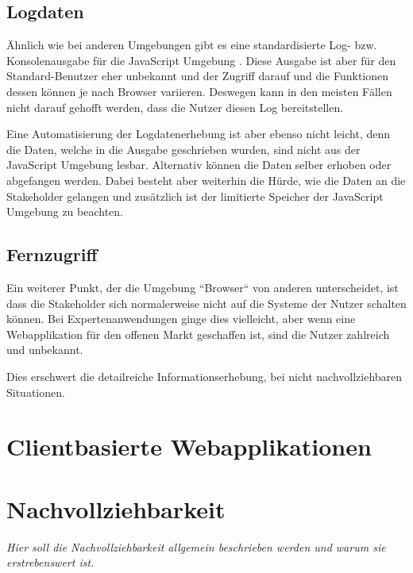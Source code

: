 \subsection{Logdaten}

Ähnlich wie bei anderen Umgebungen gibt es eine standardisierte Log- bzw. Konsolenausgabe für die JavaScript Umgebung \cite{MDNConsole}. Diese Ausgabe ist aber für den Standard-Benutzer eher unbekannt und der Zugriff darauf und die Funktionen dessen können je nach Browser variieren. Deswegen kann in den meisten Fällen nicht darauf gehofft werden, dass die Nutzer diesen Log bereitstellen.

Eine Automatisierung der Logdatenerhebung ist aber ebenso nicht leicht, denn die Daten, welche in die Ausgabe geschrieben wurden, sind nicht aus der JavaScript Umgebung lesbar. Alternativ können die Daten selber erhoben oder abgefangen werden. Dabei besteht aber weiterhin die Hürde, wie die Daten an die Stakeholder gelangen und zusätzlich ist der limitierte Speicher der JavaScript Umgebung zu beachten.

\subsection{Fernzugriff}

Ein weiterer Punkt, der die Umgebung ``Browser`` von anderen unterscheidet, ist dass die Stakeholder sich normalerweise nicht auf die Systeme der Nutzer schalten können. Bei Expertenanwendungen ginge dies vielleicht, aber wenn eine Webapplikation für den offenen Markt geschaffen ist, sind die Nutzer zahlreich und unbekannt.

Dies erschwert die detailreiche Informationserhebung, bei nicht nachvollziehbaren Situationen.

\section{Clientbasierte Webapplikationen}

	
\newpage



\newpage

\section{Nachvollziehbarkeit}

	\textit{Hier soll die Nachvollziehbarkeit allgemein beschrieben werden und warum sie erstrebenswert ist.}

